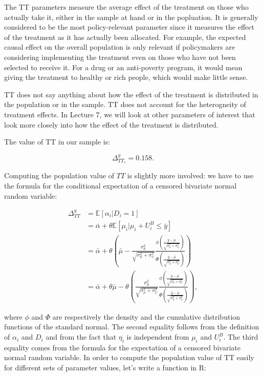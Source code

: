 \documentclass[]{book}
\newcommand{\esp}[1]{\mathbb{E}[ #1 ]}
\theoremstyle{definition}
\theoremstyle{definition}
\theoremstyle{definition}
\theoremstyle{remark}
\let\BeginKnitrBlock\begin \let\EndKnitrBlock\end
\begin{document}
The TT parameters measure the average effect of the treatment on those who actually take it, either in the sample at hand or in the popluation.
It is generally considered to be the most policy-relevant parameter since it measures the effect of the treatment as it has actually been allocated.
For example, the expected causal effect on the overall population is only relevant if policymakers are considering implementing the treatment even on those who have not been selected to receive it.
For a drug or an anti-poverty program, it would mean giving the treatment to healthy or rich people, which would make little sense.

TT does not say anything about how the effect of the treatment is distributed in the population or in the sample.
TT does not account for the heterogneity of treatment effects.
In Lecture 7, we will look at other parameters of interest that look more closely into how the effect of the treatment is distributed.

\BeginKnitrBlock{example}
\protect\hypertarget{exm:unnamed-chunk-9}{}{\label{exm:unnamed-chunk-9} }The value of TT in our sample is:
\EndKnitrBlock{example}

\[
\Delta^y_{TT_s}=0.158.
\]

Computing the population value of \(TT\) is slightly more involved: we have to use the formula for the conditional expectation of a censored bivariate normal random variable:

\begin{align*}
\Delta^y_{TT} & = \esp{\alpha_i|D_i=1}\\
              & = \bar{\alpha}+\theta\esp{\mu_i|\mu_i+U_i^B\leq\bar{y}}\\
              & = \bar{\alpha}+\theta\left(\bar{\mu} - \frac{\sigma^2_{\mu}}{\sqrt{\sigma^2_{\mu}+\sigma^2_{U}}}\frac{\phi\left(\frac{\bar{y}-\bar{\mu}}{\sqrt{\sigma^2_{\mu}+\sigma^2_{U}}}\right)}{\Phi\left(\frac{\bar{y}-\bar{\mu}}{\sqrt{\sigma^2_{\mu}+\sigma^2_{U}}}\right)}\right)\\
              & = \bar{\alpha}+\theta\bar{\mu}-\theta\left(\frac{\sigma^2_{\mu}}{\sqrt{\sigma^2_{\mu}+\sigma^2_{U}}}\frac{\phi\left(\frac{\bar{y}-\bar{\mu}}{\sqrt{\sigma^2_{\mu}+\sigma^2_{U}}}\right)}{\Phi\left(\frac{\bar{y}-\bar{\mu}}{\sqrt{\sigma^2_{\mu}+\sigma^2_{U}}}\right)}\right),
\end{align*}

where \(\phi\) and \(\Phi\) are respectively the density and the cumulative distribution functions of the standard normal.
The second equality follows from the definition of \(\alpha_i\) and \(D_i\) and from the fact that \(\eta_i\) is independent from \(\mu_i\) and \(U_i^B\).
The third equality comes from the formula for the expectation of a censored bivariate normal random variable.
In order to compute the population value of TT easily for different sets of parameter values, let's write a function in R:
\end{document}
